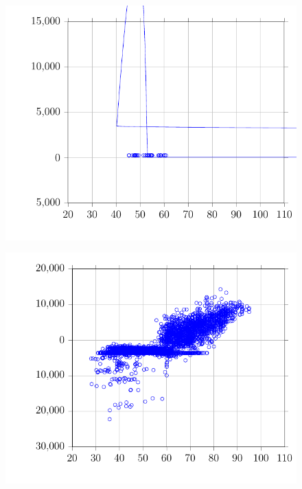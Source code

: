 \begin{figure}
\centering
\includegraphics{Plots/39-PrestonRoyalFPB-06-ZoneLoad/2017-08-07-0922-BtuhrvsOADryBulbTemperatureNOAAF.pdf}
\caption{}
\label{fig:2017-08-07-0922-BtuhrvsOADryBulbTemperatureNOAAF}
\end{figure}

\begin{figure}
\centering
\includegraphics{Plots/40-PrestonRoaylFPB-07-ZoneLoad/2017-08-07-0927-BtuhrvsOADryBulbTemperatureNOAAF.pdf}
\caption{}
\label{fig:2017-08-07-0927-BtuhrvsOADryBulbTemperatureNOAAF}
\end{figure}

